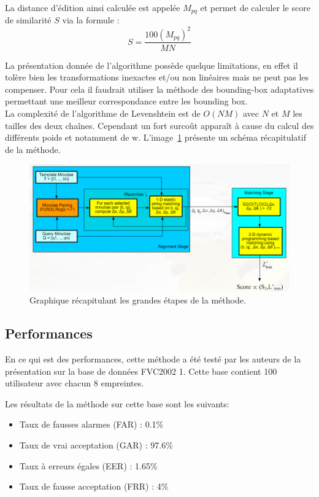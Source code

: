 \documentclass{report}
\begin{document}
La distance d'édition ainsi calculée est appelée $M_{pq}$ et permet de
calculer le score de similarité $S$ via la formule :
$$S = \frac{100 (M_{pq})^2}{MN}$$

La présentation donnée de l'algorithme possède quelque limitations, en
effet il tolère bien les transformations inexactes et/ou non linéaires
mais ne peut pas les compenser. Pour cela il faudrait utiliser la
méthode des bounding-box adaptatives permettant une meilleur
correspondance entre les bounding box.\\

La complexité de l'algorithme de Levenshtein est de $O(NM)$ avec $N$
et $M$ les tailles des deux chaînes. Cependant un fort surcoût
apparaît à cause du calcul des différents poids et notamment de
w. L'image~\ref{fig:recap} présente un schéma récapitulatif de la
méthode.

\begin{figure}
  \hspace{-10em}
  \includegraphics[scale=.6]{figrecap.png}
  \caption{Graphique récapitulant les grandes étapes de la méthode.}
  \label{fig:recap}
\end{figure}

\subsection{Performances}
\label{sec:performances}

En ce qui est des performances, cette méthode a été testé par les
auteurs de la présentation sur la base de données FVC2002 1. Cette
base contient 100 utilisateur avec chacun 8 empreintes.

Les résultats de la méthode sur cette base sont les suivants:
\begin{itemize}
\item Taux de fausses alarmes (FAR) : 0.1\%
\item Taux de vrai acceptation (GAR) : 97.6\%
\item Taux à erreurs égales (EER) : 1.65\%
\item Taux de fausse acceptation (FRR) : 4\%
\end{itemize}
\end{document}
